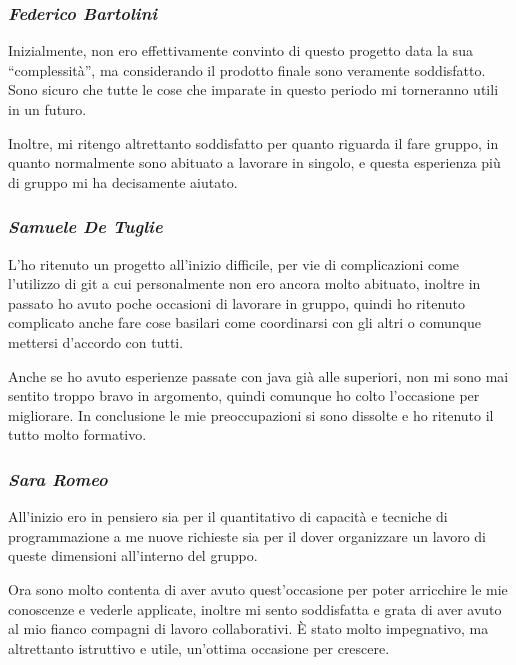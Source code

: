 \documentclass[a4paper,titlepage,12pt]{article}
\begin{document}
\subsubsection*{\large \slshape Federico Bartolini}
\par \noindent Inizialmente, non ero effettivamente convinto di questo progetto data la sua “complessità”, ma considerando il prodotto finale sono veramente soddisfatto. Sono sicuro che tutte le cose che imparate in questo periodo mi torneranno utili in un futuro.
\par \noindent Inoltre, mi ritengo altrettanto soddisfatto per quanto riguarda il fare gruppo, in quanto normalmente sono abituato a lavorare in singolo, e questa esperienza più di gruppo mi ha decisamente aiutato.

\subsubsection*{\large \slshape Samuele De Tuglie}
\par \noindent L’ho ritenuto un progetto all’inizio difficile, per vie di complicazioni come l’utilizzo di git a cui personalmente non ero ancora molto abituato, inoltre in passato ho avuto poche occasioni di lavorare in gruppo, quindi ho ritenuto complicato anche fare cose basilari come coordinarsi con gli altri o comunque mettersi d’accordo con tutti. 
\par \noindent Anche se ho avuto esperienze passate con java già alle superiori, non mi sono mai sentito troppo bravo in argomento, quindi comunque ho colto l’occasione per migliorare. 
In conclusione le mie preoccupazioni si sono dissolte e ho ritenuto il tutto molto formativo.

\subsubsection*{\large \slshape Sara Romeo}
\par \noindent All'inizio ero in pensiero sia per il quantitativo di capacità e tecniche di programmazione a me nuove richieste sia per il dover organizzare un lavoro di queste dimensioni all'interno del gruppo.
\par \noindent Ora sono molto contenta di aver avuto quest'occasione per poter arricchire le mie conoscenze e vederle applicate, inoltre mi sento soddisfatta e grata di aver avuto al mio fianco compagni di lavoro collaborativi. È stato molto impegnativo, ma altrettanto istruttivo e utile, un'ottima occasione per crescere.
\end{document}
